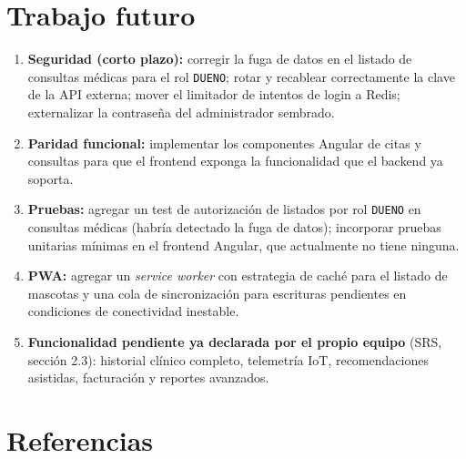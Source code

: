 \documentclass[11pt,a4paper]{article}
\begin{document}
\section{Trabajo futuro}

\begin{enumerate}[leftmargin=*]
    \item \textbf{Seguridad (corto plazo):} corregir la fuga de datos en el
    listado de consultas médicas para el rol \texttt{DUENO}; rotar y
    recablear correctamente la clave de la API externa; mover el
    limitador de intentos de login a Redis; externalizar la contraseña del
    administrador sembrado.
    \item \textbf{Paridad funcional:} implementar los componentes Angular
    de citas y consultas para que el frontend exponga la funcionalidad que
    el backend ya soporta.
    \item \textbf{Pruebas:} agregar un test de autorización de listados por
    rol \texttt{DUENO} en consultas médicas (habría detectado la fuga de
    datos); incorporar pruebas unitarias mínimas en el frontend Angular,
    que actualmente no tiene ninguna.
    \item \textbf{PWA:} agregar un \emph{service worker} con estrategia de
    caché para el listado de mascotas y una cola de sincronización para
    escrituras pendientes en condiciones de conectividad inestable.
    \item \textbf{Funcionalidad pendiente ya declarada por el propio
    equipo} (SRS, sección 2.3): historial clínico completo, telemetría
    IoT, recomendaciones asistidas, facturación y reportes avanzados.
\end{enumerate}

\newpage
\section*{Referencias}
\end{document}
